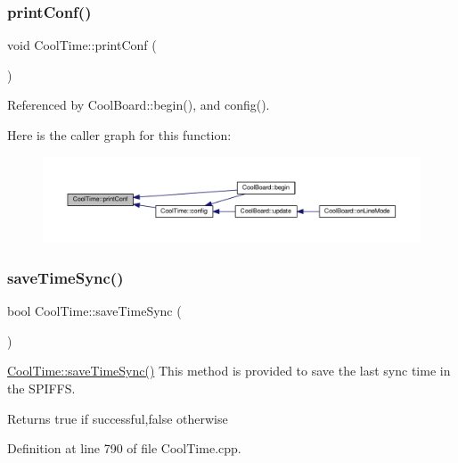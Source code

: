 \subsubsection{\texorpdfstring{print\+Conf()}{printConf()}}
{\footnotesize\ttfamily void Cool\+Time\+::print\+Conf (\begin{DoxyParamCaption}{ }\end{DoxyParamCaption})}



Referenced by Cool\+Board\+::begin(), and config().

Here is the caller graph for this function\+:
\nopagebreak
\begin{figure}[H]
\begin{center}
\leavevmode
\includegraphics[width=350pt]{classCoolTime_af355e7f9b3898211cd2ff25eab5933b1_icgraph}
\end{center}
\end{figure}
\mbox{\label{classCoolTime_ae9658c9b377510d469e3b88edf33ee85}} 
\subsubsection{\texorpdfstring{save\+Time\+Sync()}{saveTimeSync()}\hspace{0.1cm}{\footnotesize\ttfamily [1/2]}}
{\footnotesize\ttfamily bool Cool\+Time\+::save\+Time\+Sync (\begin{DoxyParamCaption}{ }\end{DoxyParamCaption})}

\hyperlink{classCoolTime_ae9658c9b377510d469e3b88edf33ee85}{Cool\+Time\+::save\+Time\+Sync()} This method is provided to save the last sync time in the S\+P\+I\+F\+FS.

\begin{DoxyReturn}{Returns}
true if successful,false otherwise 
\end{DoxyReturn}


Definition at line 790 of file Cool\+Time.\+cpp.



